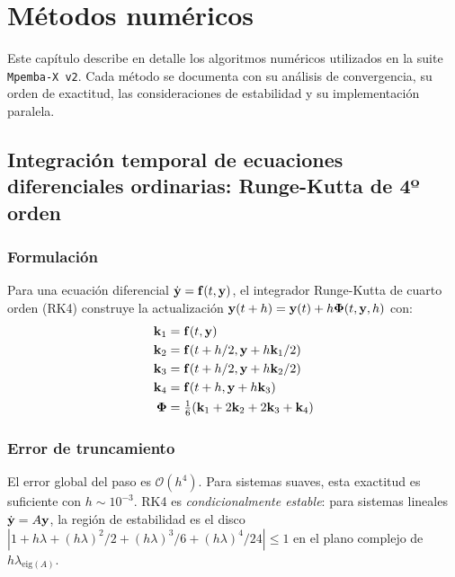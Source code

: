 \chapter{Métodos numéricos}
\label{ch:metodos_numericos}

Este capítulo describe en detalle los algoritmos numéricos utilizados en la 
suite \texttt{Mpemba-X v2}. Cada método se documenta con su análisis de 
convergencia, su orden de exactitud, las consideraciones de estabilidad y su 
implementación paralela.

\section{Integración temporal de ecuaciones diferenciales ordinarias: Runge-Kutta de 4º orden}

\subsection{Formulación}

Para una ecuación diferencial $\dot{\vb{y}} = \vb{f}(t, \vb{y})$, el integrador 
Runge-Kutta de cuarto orden (RK4) construye la actualización 
$\vb{y}(t + h) = \vb{y}(t) + h \vb{\Phi}(t, \vb{y}, h)$ con:
\begin{equation}
\begin{aligned}
    \vb{k}_1 &= \vb{f}(t, \vb{y}) \\
    \vb{k}_2 &= \vb{f}(t + h/2, \vb{y} + h \vb{k}_1 / 2) \\
    \vb{k}_3 &= \vb{f}(t + h/2, \vb{y} + h \vb{k}_2 / 2) \\
    \vb{k}_4 &= \vb{f}(t + h, \vb{y} + h \vb{k}_3) \\
    \vb{\Phi} &= \tfrac{1}{6}(\vb{k}_1 + 2 \vb{k}_2 + 2 \vb{k}_3 + \vb{k}_4)
\end{aligned}
\end{equation}

\subsection{Error de truncamiento}

El error global del paso es $\mathcal{O}(h^4)$. Para sistemas suaves, esta 
exactitud es suficiente con $h \sim 10^{-3}$. RK4 es \emph{condicionalmente 
estable}: para sistemas lineales $\dot{\vb{y}} = A \vb{y}$, la región de 
estabilidad es el disco $|1 + h\lambda + (h\lambda)^2/2 + (h\lambda)^3/6 + (h\lambda)^4/24| \leq 1$ 
en el plano complejo de $h \lambda_{\mathrm{eig}(A)}$.

